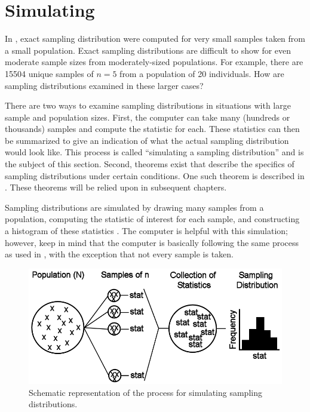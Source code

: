 \documentclass[10pt,openany]{book}\usepackage[]{graphicx}\usepackage[]{color}
\begin{document}


\vspace{-12pt}
\section{Simulating}  \label{sect:SDSimulate}
\vspace{-12pt}
In , exact sampling distribution were computed for very small samples taken from a small population.  Exact sampling distributions are difficult to show for even moderate sample sizes from moderately-sized populations.  For example, there are 15504 unique samples of $n=5$ from a population of 20 individuals.  How are sampling distributions examined in these larger cases?

There are two ways to examine sampling distributions in situations with large sample and population sizes.  First, the computer can take many (hundreds or thousands) samples and compute the statistic for each.  These statistics can then be summarized to give an indication of what the actual sampling distribution would look like.  This process is called ``simulating a sampling distribution'' and is the subject of this section.  Second, theorems exist that describe the specifics of sampling distributions under certain conditions.  One such theorem is described in .  These theorems will be relied upon in subsequent chapters.


Sampling distributions are simulated by drawing many samples from a population, computing the statistic of interest for each sample, and constructing a histogram of these statistics .  The computer is helpful with this simulation; however, keep in mind that the computer is basically following the same process as used in , with the exception that not every sample is taken.

\begin{figure}[htbp]
  \centering
    \includegraphics[width=4.5in]{Figs/Sampling_Distribution_Scheme.png}
  \caption{Schematic representation of the process for simulating sampling distributions.}
  \label{fig:SamplingDistributionScheme}
\end{figure}
\end{document}
